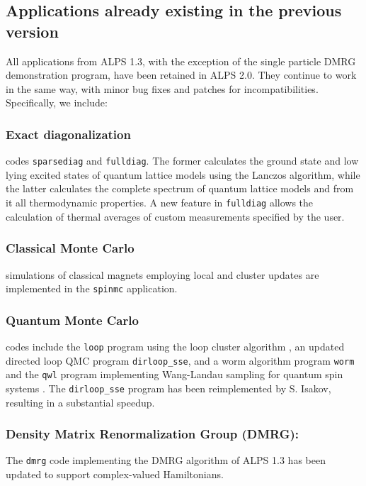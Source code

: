 \documentclass[12pt]{iopart}
\begin{document}
\subsection{Applications already existing in the previous version}
All applications from ALPS 1.3, with the exception of the single particle DMRG demonstration program, have been retained in ALPS 2.0. They continue to work in the same way, with minor bug fixes and patches for incompatibilities. Specifically, we include:

\subsubsection{Exact diagonalization}
codes {\tt sparsediag} and {\tt fulldiag}. The former calculates the ground state
and low lying excited states of quantum lattice models using the
Lanczos \cite{lanczos} algorithm, while the latter calculates the complete
spectrum of quantum lattice models and from it all thermodynamic
properties. A new feature in {\tt fulldiag} allows the calculation of thermal averages of custom measurements specified by the user.



\subsubsection{Classical Monte Carlo} 
simulations of classical magnets employing local and cluster
updates \cite{Swendsen87} are implemented in the {\tt spinmc} application.

\subsubsection{Quantum Monte Carlo} codes include the {\tt loop}  program using the loop cluster
algorithm \cite{Evertz03,Todo01,looper}, an updated directed loop QMC \cite{Sylyuasen,Alet2005} program {\tt dirloop\_sse}, and a  worm algorithm \cite{Prokofev98A} program  {\tt worm} and the {\tt qwl} program implementing Wang-Landau sampling for quantum spin systems \cite{Troyer03}. The {\tt dirloop\_sse} program has been reimplemented by S. Isakov, resulting in a substantial speedup.

  
\subsubsection{Density Matrix Renormalization Group (DMRG):} The {\tt dmrg} code implementing the DMRG algorithm \cite{White1992,Schollwock2005}  of ALPS 1.3 has been updated to support complex-valued Hamiltonians.
\end{document}
